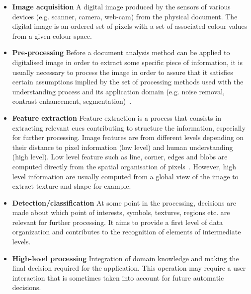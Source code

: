 \begin{itemize}
	\item \textbf{Image acquisition} A digital image produced by the sensors of various devices (e.g. scanner, camera, web-cam) from the physical document.
	The digital image is an ordered set of pixels with a set of associated colour values from a given colour space.
	\item \textbf{Pre-processing} Before a document analysis method can be applied to digitalised image in order to extract some specific piece of information, it is usually necessary to process the image in order to assure that it satisfies certain assumptions implied by the set of processing methods used with the understanding process and its application domain (e.g. noise removal, contrast enhancement, segmentation)~\cite{pal1993review,luccheseyz2001color,bhattacharyya2011brief}.
	\item \textbf{Feature extraction} Feature extraction is a process that consists in extracting relevant cues contributing to structure the information, especially for further processing.
  Image features are from different levels depending on their distance to pixel information (low level) and human understanding (high level).
	Low level feature such as line, corner, edges and blobs are computed directly from the spatial organisation of pixels~\cite{due1996feature}.
	However, high level information are usually computed from a global view of the image to extract texture and shape for example.
	\item \textbf{Detection/classification} At some point in the processing, decisions are made about which point of interests, symbols, textures, regions etc. are relevant for further processing.
  It aims to provide a first level of data organization and contributes to the recognition of elements of intermediate levels.
	\item \textbf{High-level processing} Integration of domain knowledge and making the final decision required for the application.
	This operation may require a user interaction that is sometimes taken into account for future automatic decisions.
\end{itemize}

